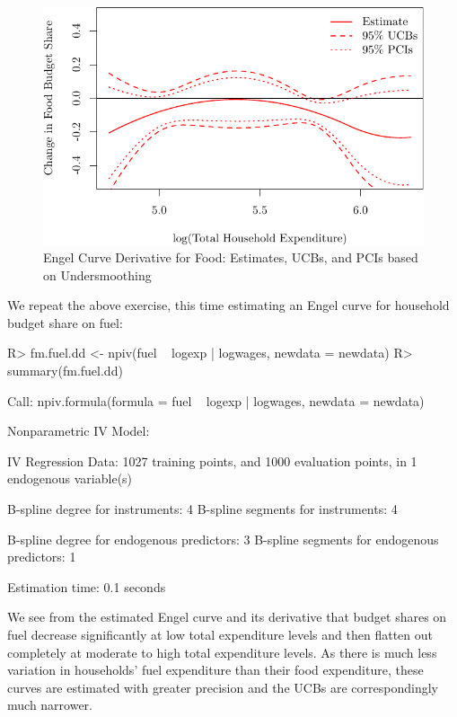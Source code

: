 \documentclass[
]{jss}
\begin{document}
\begin{figure}
\centering
\includegraphics{npiv_files/figure-latex/food-det-deriv-1.pdf}
\caption{Engel Curve Derivative for Food: Estimates, UCBs, and PCIs
based on Undersmoothing}
\end{figure}

We repeat the above exercise, this time estimating an Engel curve for
household budget share on fuel:

\begin{CodeChunk}
\begin{CodeInput}
R> fm.fuel.dd <- npiv(fuel ~ logexp | logwages, newdata = newdata)
R> summary(fm.fuel.dd)
\end{CodeInput}
\begin{CodeOutput}
Call:
npiv.formula(formula = fuel ~ logexp | logwages, newdata = newdata)

Nonparametric IV Model:

IV Regression Data: 1027 training points, and 1000 evaluation points, in 1 endogenous variable(s)

B-spline degree for instruments:             4
B-spline segments for instruments:           4

B-spline degree for endogenous predictors:   3
B-spline segments for endogenous predictors: 1

Estimation time: 0.1 seconds
\end{CodeOutput}
\end{CodeChunk}

We see from the estimated Engel curve and its derivative that budget
shares on fuel decrease significantly at low total expenditure levels
and then flatten out completely at moderate to high total expenditure
levels. As there is much less variation in households' fuel expenditure
than their food expenditure, these curves are estimated with greater
precision and the UCBs are correspondingly much narrower.
\end{document}
